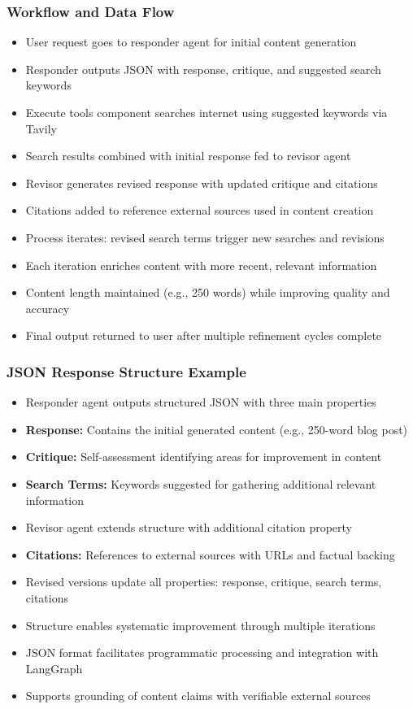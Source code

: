 \begin{frame}[fragile]\frametitle{Workflow and Data Flow}
      \begin{itemize}
          \item User request goes to responder agent for initial content generation
          \item Responder outputs JSON with response, critique, and suggested search keywords
          \item Execute tools component searches internet using suggested keywords via Tavily
          \item Search results combined with initial response fed to revisor agent
          \item Revisor generates revised response with updated critique and citations
          \item Citations added to reference external sources used in content creation
          \item Process iterates: revised search terms trigger new searches and revisions
          \item Each iteration enriches content with more recent, relevant information
          \item Content length maintained (e.g., 250 words) while improving quality and accuracy
          \item Final output returned to user after multiple refinement cycles complete
      \end{itemize}
\end{frame}

\begin{frame}[fragile]\frametitle{JSON Response Structure Example}
      \begin{itemize}
          \item Responder agent outputs structured JSON with three main properties
          \item \textbf{Response:} Contains the initial generated content (e.g., 250-word blog post)
          \item \textbf{Critique:} Self-assessment identifying areas for improvement in content
          \item \textbf{Search Terms:} Keywords suggested for gathering additional relevant information
          \item Revisor agent extends structure with additional citation property
          \item \textbf{Citations:} References to external sources with URLs and factual backing
          \item Revised versions update all properties: response, critique, search terms, citations
          \item Structure enables systematic improvement through multiple iterations
          \item JSON format facilitates programmatic processing and integration with LangGraph
          \item Supports grounding of content claims with verifiable external sources
      \end{itemize}
\end{frame}


